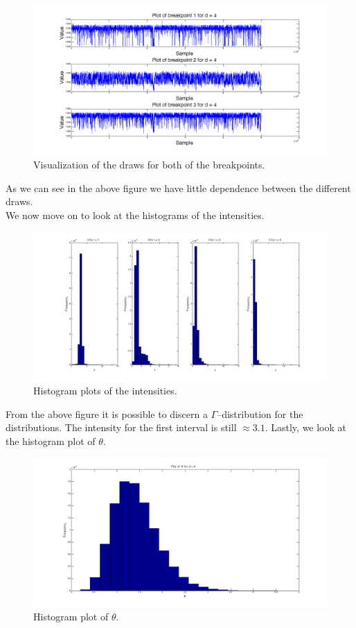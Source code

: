 \begin{figure}[H]
\centering
\includegraphics[scale=0.26]{./Figures/t3.png}
\caption{Visualization of the draws for both of the breakpoints.}
\label{fig:t3}
\end{figure}

As we can see in the above figure we have little dependence between the different draws. \\ We now move on to look at the histograms of the intensities.

\begin{figure}[H]
\centering
\includegraphics[scale=0.26]{./Figures/lpost3.png}
\caption{Histogram plots of the intensities.}
\label{fig:lpost3}
\end{figure}

From the above figure it is possible to discern a $\Gamma$--distribution for the distributions. The intensity for the first interval is still $\approx 3.1$. Lastly, we look at the histogram plot of $\theta$.

\begin{figure}[H]
\centering
\includegraphics[scale=0.26]{./Figures/thetapost3.png}
\caption{Histogram plot of $\theta$.}
\label{fig:thetapost3}
\end{figure}

